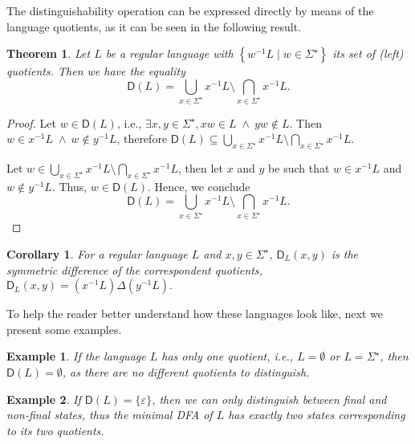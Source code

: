 \documentclass{article}
\newtheorem{theorem}{Theorem}
\newtheorem{corollary}{Corollary}
\newtheorem{example}{Example}
\newcommand{\dfa}{DFA\xspace}
\newcommand{\disw}[2]{\mathsf{D}_{#1}(#2)}
\newcommand{\dis}[1]{\mathsf{D}(#1)}
\newcommand{\Set}[1]{\left\{ #1 \right\}}
\newcommand{\kleene}[1]{#1^\star}
\newcommand{\AND}{\;\wedge\:}
\begin{document}
The distinguishability operation can be expressed directly by means of
the language quotients, as it can be seen in the following result. 
\begin{theorem}
\label{theo:dist-quot}
Let $L$ be a regular language with $\Set{w^{-1}L\;|\;w\in
  \kleene{\Sigma}}$ its set of (left) quotients. Then we have the equality
\begin{equation*}
 \dis{L} = \bigcup_{x\in\kleene{\Sigma}}x^{-1}L \setminus
 \bigcap_{x\in\kleene{\Sigma}}x^{-1}L. 
\end{equation*}
\end{theorem}
\begin{proof}
Let $w\in \dis{L}$, i.e.,
 $\exists x,y\in\Sigma^\star, xw\in L
                          \AND yw\notin L$. 
Then $w\in x^{-1}L \AND w\notin y^{-1}L$, therefore  
${\displaystyle \dis{L} \subseteq \bigcup_{x\in\kleene{\Sigma}}x^{-1}L
  \setminus \bigcap_{x\in\kleene{\Sigma}}x^{-1}L}$. 

Let ${\displaystyle w\in \bigcup_{x\in\kleene{\Sigma}}x^{-1}L
  \setminus \bigcap_{x\in\kleene{\Sigma}}x^{-1}L}$, then let $x$ and
$y$ be such that $w\in x^{-1}L$ and $w\notin y^{-1}L$. Thus, $w\in
\dis{L}$. Hence, we conclude
$$\dis{L}=\bigcup_{x\in\kleene{\Sigma}}x^{-1}L \setminus
\bigcap_{x\in\kleene{\Sigma}}x^{-1}L.$$ 
\end{proof}
\begin{corollary}
\label{cor;diffxyquot}
For a regular language $L$ and $x,y\in \Sigma^\star$, $\disw{L}{x,y}$ is 
the symmetric difference of the correspondent quotients, 
$\disw{L}{x,y}=(x^{-1}L)\Delta (y^{-1}L).$
\end{corollary}

To help the reader better understand  how these languages look like, next we present 
some examples.

\begin{example}
\label{ex:singleton}
 If the language $L$ has only one quotient, i.e., $L=\emptyset$ or
 $L=\kleene{\Sigma}$, then $\dis{L}=\emptyset$, as there are no
 different quotients to distinguish. 
\end{example}

\begin{example}
\label{ex:epsilon}
If $\dis{L}=\{\varepsilon\}$, then we can only distinguish between final 
and non-final states, thus the minimal \dfa of $L$ has exactly two states 
corresponding to its  two quotients.
\end{example}
\end{document}
